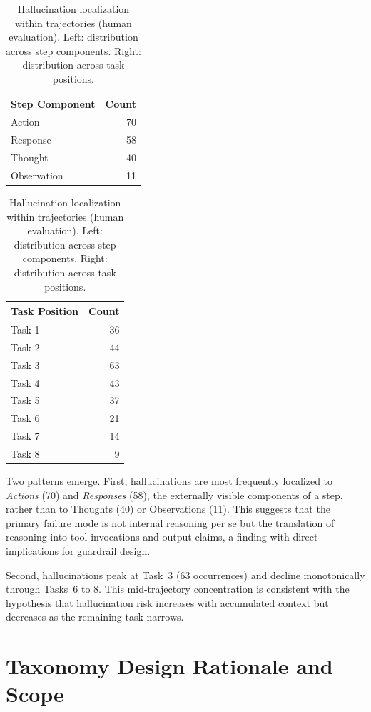 \documentclass{article}
\begin{document}
\begin{table}[t]
\caption{Hallucination localization within trajectories (human evaluation). Left: distribution across step components. Right: distribution across task positions.}
\label{tab:localization}
\centering
\small
\begin{tabular}{lr}
\toprule
\textbf{Step Component} & \textbf{Count} \\
\midrule
Action       & 70 \\
Response     & 58 \\
Thought      & 40 \\
Observation  & 11 \\
\bottomrule
\end{tabular}
\hspace{2em}
\begin{tabular}{lr}
\toprule
\textbf{Task Position} & \textbf{Count} \\
\midrule
Task 1 & 36 \\
Task 2 & 44 \\
Task 3 & 63 \\
Task 4 & 43 \\
Task 5 & 37 \\
Task 6 & 21 \\
Task 7 & 14 \\
Task 8 & 9  \\
\bottomrule
\end{tabular}
\end{table}

Two patterns emerge. First, hallucinations are most frequently localized to \emph{Actions} (70) and \emph{Responses} (58), the externally visible components of a step, rather than to Thoughts (40) or Observations (11). This suggests that the primary failure mode is not internal reasoning per se but the translation of reasoning into tool invocations and output claims, a finding with direct implications for guardrail design.

Second, hallucinations peak at Task~3 (63 occurrences) and decline monotonically through Tasks~6 to 8. This mid-trajectory concentration is consistent with the hypothesis that hallucination risk increases with accumulated context but decreases as the remaining task narrows.

\section{Taxonomy Design Rationale and Scope}
\label{app:taxonomy_design}
\end{document}
